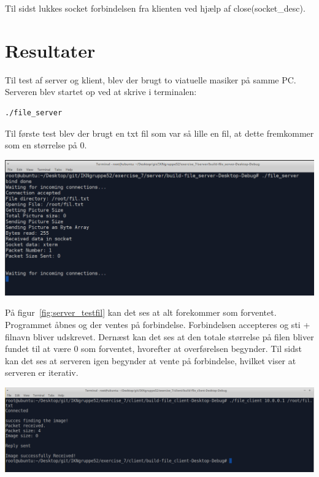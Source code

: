 \documentclass[12pt,fleqn,a4paper]{report}
\begin{document}
Til sidst lukkes socket forbindelsen fra klienten ved hjælp af close(socket\_desc).

\newpage

\chapter{Resultater}

Til test af server og klient, blev der brugt to viatuelle masiker på samme PC. Serveren blev startet op ved at skrive i terminalen: \begin{lstlisting}[backgroundcolor = \color{lightgray}, language=bash]
./file_server
\end{lstlisting}

Til første test blev der brugt en txt fil som var så lille en fil, at dette fremkommer som en størrelse på 0.

\begin{center}
	\includegraphics[width=0.9 \textwidth]{server_testfil.png}
	\label{fig:server_testfil}
\end{center}

På figur~\ref{fig:server_testfil} kan det ses at alt forekommer som forventet. 
Programmet åbnes og der ventes på forbindelse. Forbindelsen accepteres og sti + filnavn bliver udskrevet. 
Dernæst kan det ses at den totale størrelse på filen bliver fundet til at være 0 som forventet, hvorefter at overførelsen begynder. 
Til sidst kan det ses at serveren igen begynder at vente på forbindelse, hvilket viser at serveren er iterativ.
\newpage
\begin{center}
	\includegraphics[width=0.9 \textwidth]{klient_testfil.png}
	\label{fig:klient_testfil}
\end{center}
\end{document}
